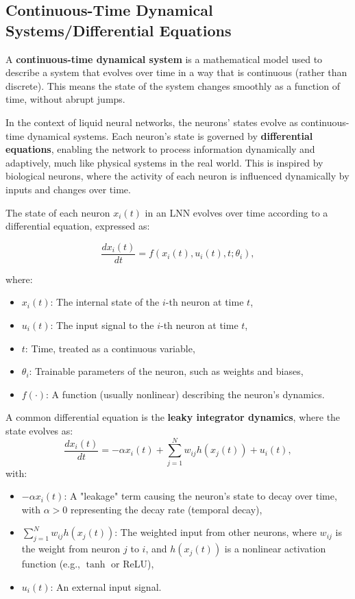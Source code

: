 \subsection{Continuous-Time Dynamical Systems/Differential Equations}

A \textbf{continuous-time dynamical system} is a mathematical model used to describe a system that evolves over time in a way that is continuous (rather than discrete). This means the state of the system changes smoothly as a function of time, without abrupt jumps.

In the context of liquid neural networks, the neurons' states evolve as continuous-time dynamical systems. Each neuron's state is governed by \textbf{differential equations}, enabling the network to process information dynamically and adaptively, much like physical systems in the real world. This is inspired by biological neurons, where the activity of each neuron is influenced dynamically by inputs and changes over time.

The state of each neuron \(x_i(t)\) in an LNN evolves over time according to a differential equation, expressed as:

\begin{equation} \label{eq:1}
    \frac{dx_i(t)}{dt} = f(x_i(t), u_i(t), t; \theta_i),
    \end{equation}

where:
\begin{itemize}
    \item \(x_i(t)\): The internal state of the \(i\)-th neuron at time \(t\),
    \item \(u_i(t)\): The input signal to the \(i\)-th neuron at time \(t\),
    \item \(t\): Time, treated as a continuous variable,
    \item \(\theta_i\): Trainable parameters of the neuron, such as weights and biases,
    \item \(f(\cdot)\): A function (usually nonlinear) describing the neuron’s dynamics.
\end{itemize}

A common differential equation is the \textbf{leaky integrator dynamics}, where the state evolves as:
\[
\frac{dx_i(t)}{dt} = -\alpha x_i(t) + \sum_{j=1}^N w_{ij} h(x_j(t)) + u_i(t),
\]
with:
\begin{itemize}
    \item \(-\alpha x_i(t)\): A "leakage" term causing the neuron’s state to decay over time, with \(\alpha > 0\) representing the decay rate (temporal decay),
    \item \(\sum_{j=1}^N w_{ij} h(x_j(t))\): The weighted input from other neurons, where \(w_{ij}\) is the weight from neuron \(j\) to \(i\), and \(h(x_j(t))\) is a nonlinear activation function (e.g., \(\tanh\) or ReLU),
    \item \(u_i(t)\): An external input signal.
\end{itemize}

